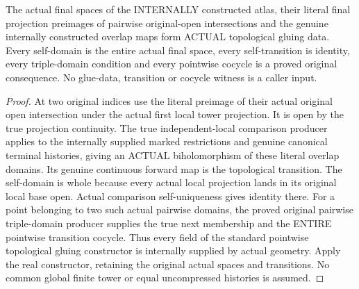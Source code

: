 \begin{definition}
\label{hir:original-input-local-terminal-actual-topological-glue-data}
\leanok
The actual final spaces of the INTERNALLY constructed atlas, their literal
final projection preimages of pairwise original-open intersections and
the genuine internally constructed overlap maps form ACTUAL topological
gluing data. Every self-domain is the entire actual final space, every
self-transition is identity, every triple-domain condition and every
pointwise cocycle is a proved original consequence. No glue-data, transition
or cocycle witness is a caller input.
\end{definition}
\begin{proof}
At two original indices use the literal preimage of their actual original
open intersection under the actual first local tower projection. It is
open by the true projection continuity. The true independent-local
comparison producer applies to the internally supplied marked restrictions
and genuine canonical terminal histories, giving an ACTUAL biholomorphism
of these literal overlap domains. Its genuine continuous forward map is
the topological transition. The self-domain is whole because every actual
local projection lands in its original local base open. Actual comparison
self-uniqueness gives identity there. For a point belonging to two such
actual pairwise domains, the proved original pairwise triple-domain
producer supplies the true next membership and the ENTIRE pointwise
transition cocycle. Thus every field of the standard pointwise topological
gluing constructor is internally supplied by actual geometry. Apply the
real constructor, retaining the original actual spaces and transitions.
No common global finite tower or equal uncompressed histories is assumed.
\end{proof}

